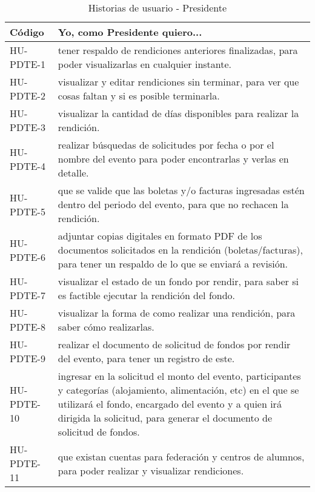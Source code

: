 \begin{table}[htbp]
    \centering
    \caption{Historias de usuario - Presidente}
    \label{tabla:Historias_Ususario_Presidente}
    \begin{tabular}{| p{2.6cm}| p{12.2cm} |}
    \hline
    Código & Yo, como Presidente quiero... \\
    \hline \hline
    HU-PDTE-1 & tener respaldo de rendiciones anteriores finalizadas, para poder visualizarlas en cualquier instante. \\ \hline

    HU-PDTE-2 & visualizar y editar rendiciones sin terminar, para ver que cosas faltan y si es posible terminarla. \\ \hline
   
    HU-PDTE-3 & visualizar la cantidad de días disponibles para realizar la rendición. \\ \hline

    HU-PDTE-4 & realizar búsquedas de solicitudes por fecha o por el nombre del evento para poder encontrarlas y verlas en detalle. \\ \hline

    HU-PDTE-5 & que se valide que las boletas y/o facturas ingresadas estén dentro del periodo del evento, para que no rechacen la rendición. 
    \\ \hline

    HU-PDTE-6 & adjuntar copias digitales en formato PDF de los documentos solicitados en la rendición (boletas/facturas), para tener un respaldo de lo que se enviará a revisión. \\ \hline

    HU-PDTE-7 & visualizar el estado de un fondo por rendir, para saber si es factible ejecutar la rendición del fondo. \\ \hline

    HU-PDTE-8 & visualizar la forma de como realizar una rendición, para saber cómo realizarlas. \\ \hline

    HU-PDTE-9 & realizar el documento de solicitud de fondos por rendir del evento, para tener un registro de este. \\ \hline

    HU-PDTE-10 & ingresar en la solicitud el monto del evento, participantes y categorías (alojamiento, alimentación, etc) en el que se utilizará el fondo, encargado del evento y a quien irá dirigida la solicitud, para generar el documento de solicitud de fondos. \\ \hline

    HU-PDTE-11 & que existan cuentas para federación y centros de alumnos, para poder realizar y visualizar rendiciones. \\ \hline

    \end{tabular}
\end{table}





    

    